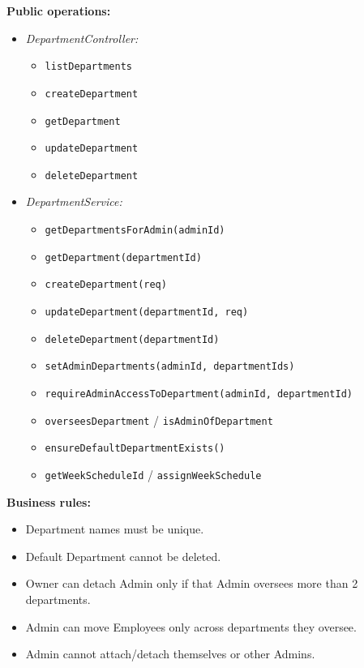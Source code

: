 \documentclass[11pt,a4paper]{article}
\begin{document}
\textbf{Public operations:}
\begin{itemize}[leftmargin=1.5em]
    \item \textit{DepartmentController:}
    \begin{itemize}[noitemsep, leftmargin=1.5em]
        \item \texttt{listDepartments}
        \item \texttt{createDepartment}
        \item \texttt{getDepartment}
        \item \texttt{updateDepartment}
        \item \texttt{deleteDepartment}
    \end{itemize}
    \item \textit{DepartmentService:}
    \begin{itemize}[noitemsep, leftmargin=1.5em]
        \item \texttt{getDepartmentsForAdmin(adminId)}
        \item \texttt{getDepartment(departmentId)}
        \item \texttt{createDepartment(req)}
        \item \texttt{updateDepartment(departmentId, req)}
        \item \texttt{deleteDepartment(departmentId)}
        \item \texttt{setAdminDepartments(adminId, departmentIds)}
        \item \texttt{requireAdminAccessToDepartment(adminId, departmentId)}
        \item \texttt{overseesDepartment} / \texttt{isAdminOfDepartment}
        \item \texttt{ensureDefaultDepartmentExists()}
        \item \texttt{getWeekScheduleId} / \texttt{assignWeekSchedule}
    \end{itemize}
\end{itemize}

\textbf{Business rules:}
\begin{itemize}[leftmargin=1.5em]
    \item Department names must be unique.
    \item Default Department cannot be deleted.
    \item Owner can detach Admin only if that Admin oversees more than 2 departments.
    \item Admin can move Employees only across departments they oversee.
    \item Admin cannot attach/detach themselves or other Admins.
\end{itemize}
\end{document}
